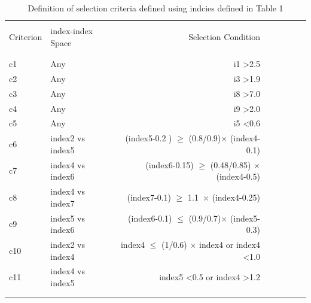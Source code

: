 \documentclass[preprint]{aastex}
\begin{document}
\clearpage
\begin{table}
\center
\begin{tabular}{llrrrrrr}
\\ \hline \hline \\
    Criterion & index-index Space & Selection Condition \\
\\ \hline \hline \\
    c1 &Any &  i1 \textgreater2.5 \\
    c2 & Any &  i3  \textgreater1.9  \\
    c3 & Any &  i8  \textgreater7.0  \\
    c4 &Any &  i9   \textgreater2.0   \\
    c5 & Any &  i5  \textless 0.6   \\
    c6 & index2 vs index5 & (index5-0.2 ) $\geq$ (0.8/0.9)$\times$ (index4-0.1)\\
    c7 & index4 vs index6 & (index6-0.15)  $\geq$ (0.48/0.85) $\times$ (index4-0.5) \\
    c8 & index4 vs index7 & (index7-0.1)  $\geq$ 1.1\ $\times$ (index4-0.25)\\
    c9 & index5 vs index6 & (index6-0.1) $\leq$ (0.9/0.7)$\times$ (index5-0.3)  \\
    c10 &index2 vs index4 &  index4 $\leq$ (1/0.6) $\times$ index4 or index4 \textless 1.0 \\
    c11 & index4 vs index5 &  index5 \textless 0.5 or  index4 \textgreater 1.2 \\
\\ \hline \hline \\
\end{tabular}
\caption{ Definition of selection criteria defined using indcies defined in Table 1}
\end{table}
\end{document}
